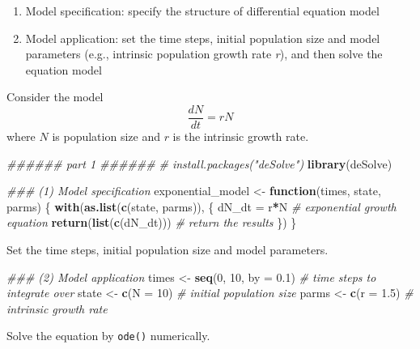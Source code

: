 \documentclass[
]{book}
\newenvironment{Shaded}{\begin{snugshade}}{\end{snugshade}}
\newcommand{\CommentTok}[1]{\textcolor[rgb]{0.56,0.35,0.01}{\textit{#1}}}
\newcommand{\ControlFlowTok}[1]{\textcolor[rgb]{0.13,0.29,0.53}{\textbf{#1}}}
\newcommand{\DataTypeTok}[1]{\textcolor[rgb]{0.13,0.29,0.53}{#1}}
\newcommand{\DecValTok}[1]{\textcolor[rgb]{0.00,0.00,0.81}{#1}}
\newcommand{\FloatTok}[1]{\textcolor[rgb]{0.00,0.00,0.81}{#1}}
\newcommand{\KeywordTok}[1]{\textcolor[rgb]{0.13,0.29,0.53}{\textbf{#1}}}
\newcommand{\NormalTok}[1]{#1}
\newcommand{\OperatorTok}[1]{\textcolor[rgb]{0.81,0.36,0.00}{\textbf{#1}}}
\newcommand{\StringTok}[1]{\textcolor[rgb]{0.31,0.60,0.02}{#1}}
\begin{document}
\begin{enumerate}
\def\labelenumi{(\arabic{enumi})}
\item
  Model specification: specify the structure of differential equation model
\item
  Model application: set the time steps, initial population size and model parameters (e.g., intrinsic population growth rate \emph{r}), and then solve the equation model
\end{enumerate}

Consider the model
\[
\frac{dN}{dt} = rN
\]
where \(N\) is population size and \(r\) is the intrinsic growth rate.

\begin{Shaded}
\begin{Highlighting}[]
\CommentTok{###### part 1 ######}
\CommentTok{# install.packages("deSolve")}
\KeywordTok{library}\NormalTok{(deSolve)}

\CommentTok{### (1) Model specification}
\NormalTok{exponential_model <-}\StringTok{ }\ControlFlowTok{function}\NormalTok{(times, state, parms) \{}
  \KeywordTok{with}\NormalTok{(}\KeywordTok{as.list}\NormalTok{(}\KeywordTok{c}\NormalTok{(state, parms)), \{}
\NormalTok{    dN_dt =}\StringTok{ }\NormalTok{r}\OperatorTok{*}\NormalTok{N  }\CommentTok{# exponential growth equation}
    \KeywordTok{return}\NormalTok{(}\KeywordTok{list}\NormalTok{(}\KeywordTok{c}\NormalTok{(dN_dt)))  }\CommentTok{# return the results}
\NormalTok{  \})}
\NormalTok{\}}
\end{Highlighting}
\end{Shaded}

Set the time steps, initial population size and model parameters.

\begin{Shaded}
\begin{Highlighting}[]
\CommentTok{### (2) Model application}
\NormalTok{times <-}\StringTok{ }\KeywordTok{seq}\NormalTok{(}\DecValTok{0}\NormalTok{, }\DecValTok{10}\NormalTok{, }\DataTypeTok{by =} \FloatTok{0.1}\NormalTok{)  }\CommentTok{# time steps to integrate over}
\NormalTok{state <-}\StringTok{ }\KeywordTok{c}\NormalTok{(}\DataTypeTok{N =} \DecValTok{10}\NormalTok{)  }\CommentTok{# initial population size}
\NormalTok{parms <-}\StringTok{ }\KeywordTok{c}\NormalTok{(}\DataTypeTok{r =} \FloatTok{1.5}\NormalTok{)  }\CommentTok{# intrinsic growth rate}
\end{Highlighting}
\end{Shaded}

Solve the equation by \texttt{ode()} numerically.
\end{document}
